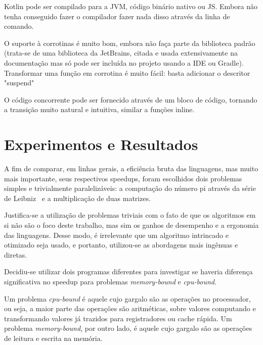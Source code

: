 \documentclass[12pt,a4paper]{article}
\begin{document}
Kotlin pode ser compilado para a JVM, código binário nativo ou JS. Embora não tenha conseguido fazer o compilador fazer nada disso através da linha de comando.

O suporte à corrotinas é muito bom, embora não faça parte da biblioteca padrão (trata-se de uma biblioteca da JetBrains, citada e usada extensivamente na documentação mas só pode ser incluída no projeto usando a IDE ou Gradle). Transformar uma função em corrotina é muito fácil: basta adicionar o descritor "suspend"

O código concorrente pode ser fornecido através de um bloco de código, tornando a transição muito natural e intuitiva, similar a funções inline.






\newpage
\section{Experimentos e Resultados}
\label{sec:experimentos e resultados}

A fim de comparar, em linhas gerais, a eficiência bruta das linguagens, mas muito mais importante, seus respectivos speedups, foram escolhidos dois problemas simples e trivialmente paralelizáveis: a computação do número pi através da série de Leibniz~\cite{weisstein2002pi} e a multiplicação de duas matrizes.

Justifica-se a utilização de problemas triviais com o fato de que os algoritmos em si não são o foco deste trabalho, mas sim os ganhos de desempenho e a ergonomia das linguagens. Desse modo, é irrelevante que um algoritmo intrincado e otimizado seja usado, e portanto, utilizou-se as abordagens mais ingênuas e diretas.

Decidiu-se utilizar dois programas diferentes para investigar se haveria diferença significativa no speedup para problemas \emph{memory-bound} e \emph{cpu-bound}.

Um problema \emph{cpu-bound} é aquele cujo gargalo são as operações no processador, ou seja, a maior parte das operações são aritméticas, sobre valores computando e transformando valores já trazidos para registradores ou cache rápida. Um problema \emph{memory-bound}, por outro lado, é aquele cujo gargalo são as operações de leitura e escrita na memória.
\end{document}
